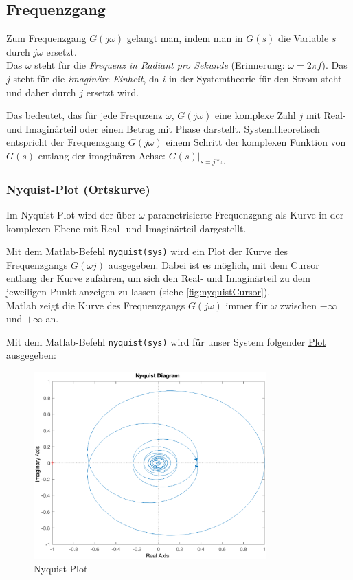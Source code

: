 \subsection{Frequenzgang}
Zum Frequenzgang $G(j \omega)$ gelangt man, indem man in $G(s)$ die Variable $s$ durch $j \omega$ ersetzt.\\
Das $\omega$ steht für die \textit{Frequenz in Radiant pro Sekunde} (Erinnerung: $\omega = 2\pi f$). Das $j$ steht für die \textit{imaginäre Einheit}, da $i$ in der Systemtheorie für den Strom steht und daher durch $j$ ersetzt wird.

Das bedeutet, das für jede Frequzenz $\omega$, $G(j \omega)$ eine komplexe Zahl $j$ mit Real- und Imaginärteil oder einen Betrag mit Phase darstellt.
Systemtheoretisch entspricht der Frequenzgang $G(j\omega)$ einem Schritt der komplexen Funktion von $G(s)$ entlang der imaginären Achse: $G(s)|_{s = j * \omega}$

\subsubsection{Nyquist-Plot (Ortskurve)}
Im Nyquist-Plot wird der über $\omega$ parametrisierte Frequenzgang als Kurve in der komplexen Ebene mit Real- und Imaginärteil dargestellt.

Mit dem Matlab-Befehl \texttt{nyquist(sys)} wird ein Plot der Kurve des Frequenzgangs $G(\omega j)$ ausgegeben. Dabei ist es möglich, mit dem Cursor entlang der Kurve zufahren, um sich den Real- und Imaginärteil zu dem jeweiligen Punkt anzeigen zu lassen (siehe \autoref{fig:nyquistCursor}).\\
Matlab zeigt die Kurve des Frequenzgangs $G(j\omega)$ immer für $\omega$ zwischen $- \infty$ und $+ \infty$ an.

Mit dem Matlab-Befehl \texttt{nyquist(sys)} wird für unser System folgender \hyperref[fig:nyquist]{Plot} ausgegeben:

\begin{figure}[H]
    \label{fig:nyquist}
    \centering
    \includegraphics[width=0.8\textwidth]{Bilder/NyquistPT1Tt.eps}
    \caption{Nyquist-Plot}
 \end{figure}

